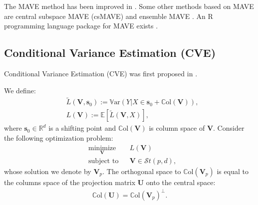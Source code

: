 \documentclass[lang=cn,10pt]{gorgeousnbook}
\numberwithin{equation}{section}%
\numberwithin{figure}{section}%
\begin{document}
The MAVE method has been improved in \cite{xia2007constructive}. Some other methods based on MAVE are central subspace MAVE (csMAVE) \cite{wang2008sliced} and ensemble MAVE \cite{yin2011sufficient2}.
An R programming language package for MAVE exists \cite{weiqiang2019mave}.


\subsection{Conditional Variance Estimation (CVE)}

Conditional Variance Estimation (CVE) was first proposed in \cite{fertl2021conditional,fertl2021sufficient}. 

\begin{theorem}[]
We define:
\begin{align*}
& \widetilde{L}(\boldsymbol{V}, \boldsymbol{s}_0) := \mathbb{V}\text{ar}(Y | X \in \boldsymbol{s}_0 + \mathbb{C}\text{ol}(\boldsymbol{V})), \\
& L(\boldsymbol{V}) := \mathbb{E}[\widetilde{L}(\boldsymbol{V}, X)],
\end{align*}
where $\boldsymbol{s}_0 \in \mathbb{R}^d$ is a shifting point and $\mathbb{C}\text{ol}(\boldsymbol{V})$ is column space of $\boldsymbol{V}$.
Consider the following optimization problem:
\begin{equation}\label{equation_CVE_optimization}
\begin{aligned}
& \underset{\boldsymbol{V}}{\text{minimize}}
& & L(\boldsymbol{V}) \\
& \text{subject to}
& & \boldsymbol{V} \in \mathcal{S}t(p,d),
\end{aligned}
\end{equation}
whose solution we denote by $\boldsymbol{V}_p$.
The orthogonal space to $\mathbb{C}\text{ol}(\boldsymbol{V}_p)$ is equal to the columns space of the projection matrix $\boldsymbol{U}$ onto the central space:
\begin{align}\label{equation_CVE_column_space_U}
\mathbb{C}\text{ol}(\boldsymbol{U}) = \mathbb{C}\text{ol}(\boldsymbol{V}_p)^{\bot}.
\end{align}
\end{theorem}
\end{document}
